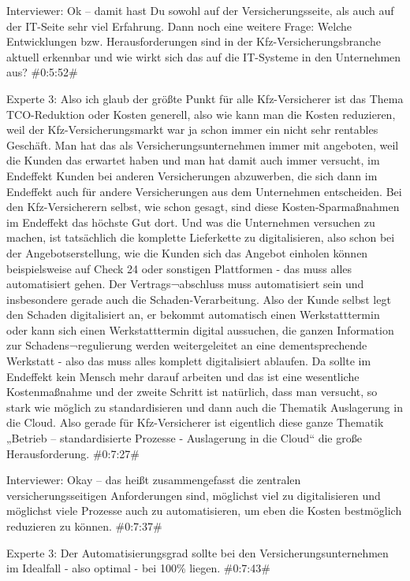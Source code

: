 Interviewer:
Ok – damit hast Du sowohl auf der Versicherungsseite, als auch auf der IT-Seite sehr viel Erfahrung. Dann noch eine weitere Frage: Welche Entwicklungen bzw. Herausforderungen sind in der Kfz-Versicherungsbranche aktuell erkennbar und wie wirkt sich das auf die IT-Systeme in den Unternehmen aus?
\#0:5:52\#

Experte 3:
Also ich glaub der größte Punkt für alle Kfz-Versicherer ist das Thema TCO-Reduktion oder Kosten generell, also wie kann man die Kosten reduzieren, weil der Kfz-Versicherungsmarkt war ja schon immer ein nicht sehr rentables Geschäft. Man hat das als Versicherungsunternehmen immer mit angeboten, weil die Kunden das erwartet haben und man hat damit auch immer versucht, im Endeffekt Kunden bei anderen Versicherungen abzuwerben, die sich dann im Endeffekt auch für andere Versicherungen aus dem Unternehmen entscheiden. Bei den Kfz-Versicherern selbst, wie schon gesagt, sind diese Kosten-Sparmaßnahmen im Endeffekt das höchste Gut dort. Und was die Unternehmen versuchen zu machen, ist tatsächlich die komplette Lieferkette zu digitalisieren, also schon bei der Angebotserstellung, wie die Kunden sich das Angebot einholen können beispielsweise auf Check 24 oder sonstigen Plattformen - das muss alles automatisiert gehen. Der Vertrags¬abschluss muss automatisiert sein und insbesondere gerade auch die Schaden-Verarbeitung. Also der Kunde selbst legt den Schaden digitalisiert an, er bekommt automatisch einen Werkstatttermin oder kann sich einen Werkstatttermin digital aussuchen, die ganzen Information zur Schadens¬regulierung werden weitergeleitet an eine dementsprechende Werkstatt - also das muss alles komplett digitalisiert ablaufen. Da sollte im Endeffekt kein Mensch mehr darauf arbeiten und das ist eine wesentliche Kostenmaßnahme und der zweite Schritt ist natürlich, dass man versucht, so stark wie möglich zu standardisieren und dann auch die Thematik Auslagerung in die Cloud. Also gerade für Kfz-Versicherer ist eigentlich diese ganze Thematik „Betrieb – standardisierte Prozesse - Auslagerung in die Cloud“ die große Herausforderung.
\#0:7:27\#

Interviewer:
Okay – das heißt zusammengefasst die zentralen versicherungsseitigen Anforderungen sind, möglichst viel zu digitalisieren und möglichst viele Prozesse auch zu automatisieren, um eben die Kosten bestmöglich reduzieren zu können.
\#0:7:37\#

Experte 3:
Der Automatisierungsgrad sollte bei den Versicherungsunternehmen im Idealfall - also optimal - bei 100\% liegen.
\#0:7:43\#

